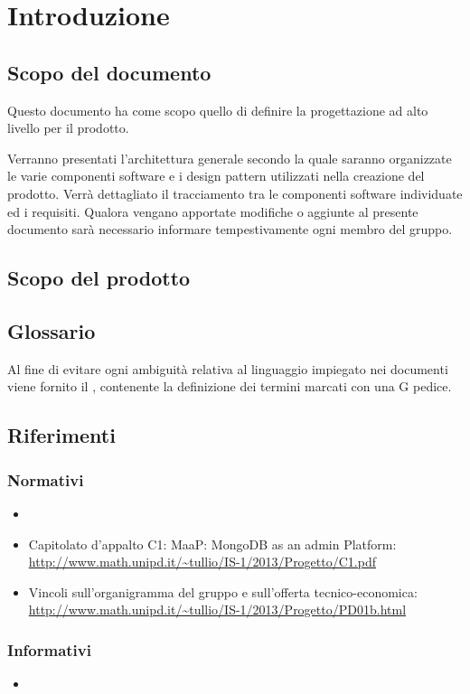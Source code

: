 \section{Introduzione}

\subsection{Scopo del documento}

Questo documento ha come scopo quello di definire la progettazione ad alto livello per il prodotto.

Verranno presentati l'architettura generale secondo la quale saranno organizzate le varie componenti software e i design pattern utilizzati nella creazione del prodotto.
Verrà dettagliato il tracciamento tra le componenti software individuate ed i requisiti.
Qualora vengano apportate modifiche o aggiunte al presente documento sarà necessario informare tempestivamente ogni membro del gruppo.

\subsection{Scopo del prodotto}

\ScopoDelProdotto

\subsection{Glossario}

Al fine di evitare ogni ambiguità relativa al linguaggio impiegato nei documenti viene fornito il \Glossario{}, contenente la definizione dei termini marcati con una G pedice.

\subsection{Riferimenti}
	\label{Riferimenti}
	
		\subsubsection{Normativi}
		
		\begin{itemize}
		\item \NormeDiProgetto{}
		\item Capitolato d'appalto C1: MaaP: MongoDB as an admin Platform:\\
			\url{http://www.math.unipd.it/~tullio/IS-1/2013/Progetto/C1.pdf}
		\item Vincoli sull'organigramma del gruppo e sull'offerta tecnico-economica:\\
			\url{http://www.math.unipd.it/~tullio/IS-1/2013/Progetto/PD01b.html}
        \end{itemize}
        
		\subsubsection{Informativi}
		\begin{itemize}
			\item \AnalisiDeiRequisiti{}
		\end{itemize}
		
	\pagebreak